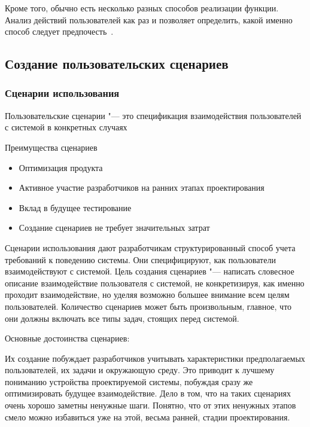 \documentclass{../industrial-development}
\begin{document}
Кроме того, обычно есть несколько разных способов реализации функции. Анализ действий пользователей как раз и позволяет определить, какой именно способ следует предпочесть~\cite[с.~113--114]{Golovach}.

\subsection{Создание пользовательских сценариев}

\begin{frame} \frametitle{Сценарии использования}
  \begin{definition}
    \alert{Пользовательские сценарии} "--- это спецификация взаимодействия пользователей с системой в конкретных случаях
  \end{definition}
  
  \begin{block}{Преимущества сценариев}
   \begin{itemize}
    \item Оптимизация продукта
    \item Активное участие разработчиков на ранних этапах проектирования
    \item Вклад в будущее тестирование
    \item Создание сценариев не требует значительных затрат
  \end{itemize}
  \end{block}
\end{frame}

\lecturenotes

Сценарии использования дают разработчикам структурированный способ учета требований к поведению системы. Они специфицируют, как пользователи взаимодействуют с системой. Цель создания сценариев "--- написать словесное описание взаимодействие пользователя с системой, не конкретизируя, как именно проходит взаимодействие, но уделяя возможно большее внимание всем целям пользователей. Количество сценариев может быть произвольным, главное, что они должны включать все типы задач, стоящих перед системой.

Основные достоинства сценариев:

Их создание побуждает разработчиков учитывать характеристики предполагаемых пользователей, их задачи и окружающую среду. Это приводит к лучшему пониманию устройства проектируемой системы, побуждая сразу же оптимизировать будущее взаимодействие. Дело в том, что на таких сценариях очень хорошо заметны ненужные шаги. Понятно, что от этих ненужных этапов смело можно избавиться уже на этой, весьма ранней, стадии проектирования.
\end{document}
